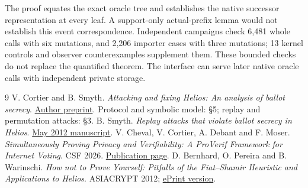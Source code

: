 \documentclass[11pt]{article}
\begin{document}
The proof equates the exact oracle tree and establishes the native successor
representation at every leaf.
A support-only actual-prefix lemma would not
establish this event correspondence.
Independent campaigns check 6,481 whole
calls with six mutations, and 2,206 importer cases with three mutations;
13 kernel controls and observer counterexamples supplement them.
These bounded
checks do not replace the quantified theorem.
The interface can serve later
native oracle calls with independent private storage.

\begin{thebibliography}{9}
 V. Cortier and B. Smyth.
\emph{Attacking and fixing Helios: An analysis of ballot secrecy}.
\href{https://publications.bensmyth.com/files/Smyth12-attacking-Helios.JCS.pdf}{Author preprint}.
Protocol and symbolic model: \S5; replay and permutation attacks: \S3.
 B. Smyth.
\emph{Replay attacks that violate ballot secrecy in Helios}.
\href{https://publications.bensmyth.com/files/Smyth12a-attacking-Helios.pdf}{May 2012 manuscript}.
 V. Cheval, V. Cortier, A. Debant and F. Moser.
\emph{Simultaneously Proving Privacy and Verifiability: A ProVerif Framework
for Internet Voting}. CSF 2026.
\href{https://bblanche.gitlabpages.inria.fr/proverif/publications/ChevalCortieretalCSF26.html}{Publication page}.
D. Bernhard, O. Pereira and B. Warinschi.
\emph{How not to Prove Yourself: Pitfalls of the Fiat--Shamir Heuristic and Applications to Helios}.
ASIACRYPT 2012; \href{https://eprint.iacr.org/2016/771.pdf}{ePrint version}.
\end{thebibliography}
\end{document}

